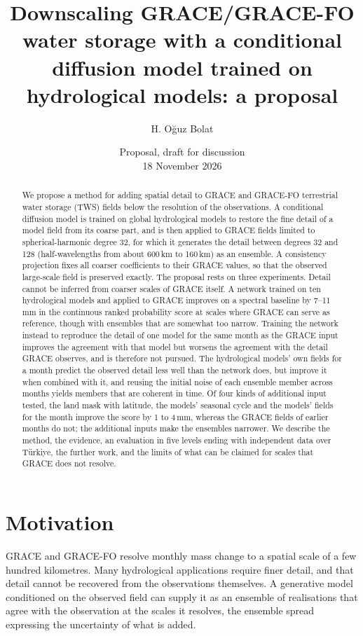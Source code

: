 \documentclass[11pt,a4paper]{article}
\title{Downscaling GRACE/GRACE-FO water storage with a conditional diffusion model trained
  on hydrological models: a proposal}
\author{H. Oğuz Bolat}
\date{Proposal, draft for discussion\\[2pt] 18 November 2026}
\begin{document}
\maketitle

\begin{abstract}
\noindent
We propose a method for adding spatial detail to GRACE and GRACE-FO terrestrial water storage
(TWS) fields below the resolution of the observations. A conditional diffusion model is
trained on global hydrological models to restore the fine detail of a model field from its
coarse part, and is then applied to GRACE fields limited to spherical-harmonic degree 32, for
which it generates the detail between degrees 32 and 128 (half-wavelengths from about 600\,km
to 160\,km) as an ensemble. A consistency projection fixes all coarser coefficients to their
GRACE values, so that the observed large-scale field is preserved exactly. The proposal rests
on three experiments. Detail cannot be inferred from coarser scales of GRACE itself. A network
trained on ten hydrological models and applied to GRACE improves on a spectral baseline by
7--11\,mm in the continuous ranked probability score at scales where GRACE can serve as
reference, though with ensembles that are somewhat too narrow. Training the network instead to
reproduce the detail of one model for the same month as the GRACE input improves the agreement
with that model but worsens the agreement with the detail GRACE observes, and is therefore not
pursued. The hydrological models' own fields for a month predict the observed detail less well
than the network does, but improve it when combined with it, and reusing the initial noise of
each ensemble member across months yields members that are coherent in time. Of four kinds of
additional input tested, the land mask with latitude, the models' seasonal cycle and the
models' fields for the month improve the score by 1 to 4\,mm, whereas the GRACE fields of
earlier months do not; the additional inputs make the ensembles narrower. We describe the method, the evidence, an
evaluation in five levels ending with
independent data over Türkiye, the further work, and the limits of what can be claimed for
scales that GRACE does not resolve.
\end{abstract}

\section{Motivation}

GRACE and GRACE-FO resolve monthly mass change to a spatial scale of a few hundred
kilometres. Many hydrological applications require finer detail, and that detail cannot be
recovered from the observations themselves. A generative model conditioned on the observed
field can supply it as an ensemble of realisations that agree with the observation at the
scales it resolves, the ensemble spread expressing the uncertainty of what is added.
\end{document}
